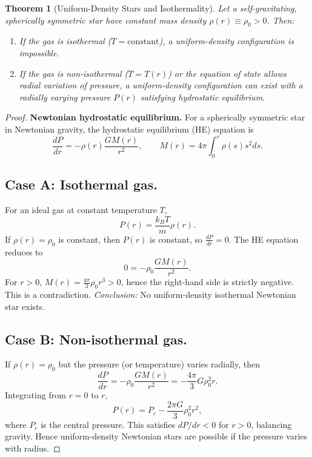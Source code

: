 \documentclass[12pt,a4paper]{article}
\newtheorem{thm}{Theorem}[section]
\numberwithin{equation}{section}
\begin{document}
\begin{thm}[Uniform-Density Stars and Isothermality]
Let a self-gravitating, spherically symmetric star have constant mass density $\rho(r) \equiv \rho_0 > 0$. Then:
\begin{enumerate}
    \item If the gas is isothermal ($T = \text{constant}$), a uniform-density configuration is impossible.
    \item If the gas is non-isothermal ($T = T(r)$) or the equation of state allows radial variation of pressure, a uniform-density configuration can exist with a radially varying pressure $P(r)$ satisfying hydrostatic equilibrium.
\end{enumerate}
\end{thm}
\begin{proof}
\textbf{Newtonian hydrostatic equilibrium.}
For a spherically symmetric star in Newtonian gravity, the hydrostatic equilibrium (HE) equation is
\begin{equation}
\frac{dP}{dr} = - \rho(r) \frac{G M(r)}{r^2}, \qquad M(r) = 4 \pi \int_0^r \rho(s) s^2 ds.
\end{equation}

\subsection*{Case A: Isothermal gas.}
For an ideal gas at constant temperature $T$,
\begin{equation}
P(r) = \frac{k_B T}{m} \rho(r).
\end{equation}
If $\rho(r) = \rho_0$ is constant, then $P(r)$ is constant, so $\frac{dP}{dr} = 0$. The HE equation reduces to
\begin{equation}
0 = - \rho_0 \frac{G M(r)}{r^2}.
\end{equation}
For $r>0$, $M(r) = \frac{4\pi}{3} \rho_0 r^3 > 0$, hence the right-hand side is strictly negative. This is a contradiction.
\emph{Conclusion:} No uniform-density isothermal Newtonian star exists.

\subsection*{Case B: Non-isothermal gas.}
If $\rho(r) = \rho_0$ but the pressure (or temperature) varies radially, then
\begin{equation}
\frac{dP}{dr} = - \rho_0 \frac{G M(r)}{r^2} = - \frac{4\pi}{3} G \rho_0^2 r.
\end{equation}
Integrating from $r=0$ to $r$,
\begin{equation}
P(r) = P_c - \frac{2\pi G}{3} \rho_0^2 r^2,
\end{equation}
where $P_c$ is the central pressure. This satisfies $dP/dr < 0$ for $r>0$, balancing gravity. Hence uniform-density Newtonian stars are possible if the pressure varies with radius.


\end{proof}
\end{document}
